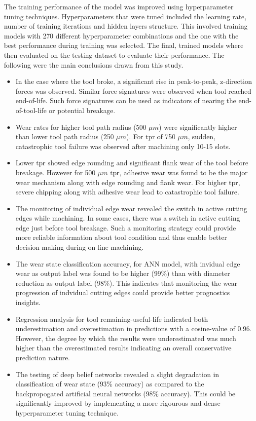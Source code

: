 \documentclass[preprint,review,12pt]{elsarticle}
\begin{document}
The training performance of the model was improved using hyperparameter tuning techniques. Hyperparameters that were tuned included the learning rate, number of training iterations and hidden layers structure. This involved training models with 270 different hyperparameter combinations and the one with the best performance during training was selected. The final, trained models where then evaluated on the testing dataset to evaluate their performance. The following were the main conclusions drawn from this study. \par

\begin{itemize}
  \item In the case where the tool broke, a significant rise in peak-to-peak, z-direction forces was observed. Similar force signatures were observed when tool reached end-of-life. Such force signatures can be used as indicators of nearing the end-of-tool-life or potential breakage.
  \item Wear rates for higher tool path radius (500 $\mu{m}$) were significantly higher than lower tool path radius (250 $\mu{m}$). For tpr of 750 $\mu{m}$, sudden, catastrophic tool failure was observed after machining only 10-15 slots.
  \item Lower tpr showed edge rounding and significant flank wear of the tool before breakage. However for 500 $\mu{m}$ tpr, adhesive wear was found to be the major wear mechanism along with edge rounding and flank wear. For higher tpr, severe chipping along with adhesive wear lead to catastrophic tool failure.
  \item The monitoring of individual edge wear revealed the switch in active cutting edges while machining. In some cases, there was a switch in active cutting edge just before tool breakage. Such a monitoring strategy could provide more reliable information about tool condition and thus enable better decision making during on-line machining.
  \item The wear state classification accuracy, for ANN model, with invidual edge wear as output label was found to be higher (99\%) than with diameter reduction as output label (98\%). This indicates that monitoring the wear progression of indvidual cutting edges could provide better prognostics insights.
  \item Regression analysis for tool remaining-useful-life indicated both underestimation and overestimation in predictions with a cosine-value of 0.96. However, the degree by which the results were underestimated was much higher than the overestimated results indicating an overall conservative prediction nature.
  \item The testing of deep belief networks revealed a slight degradation in classification of wear state (93\% accuracy) as compared to the backpropogated artificial neural networks (98\% accuracy). This could be significantly improved by implementing a more rigourous and dense hyperparameter tuning technique.
\end{itemize}
\end{document}
